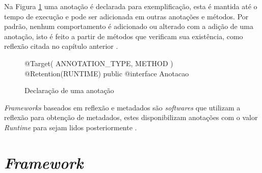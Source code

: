 \par Na Figura \ref{fig:declaracao-anotacao} uma anotação é declarada para exemplificação, esta é mantida até o tempo de execução e pode ser adicionada em outras anotações e métodos. Por padrão, nenhum comportamento é adicionado ou alterado com a adição de uma anotação, isto é feito a partir de métodos que verificam sua existência, como reflexão citada no capítulo anterior \cite{bloch2004jsr}. 

\begin{figure}[H]
    \centering
    \begin{java}
@Target({ ANNOTATION_TYPE, METHOD })
@Retention(RUNTIME)
public @interface Anotacao {
}
    \end{java}
    \caption{Declaração de uma anotação}
    \label{fig:declaracao-anotacao}
\end{figure}

\textit{Frameworks} baseados em reflexão e metadados são \textit{softwares} que utilizam a reflexão para obtenção de metadados, estes disponibilizam anotações com o valor \textit{Runtime} para sejam lidos posteriormente \cite{guerra2009pattern}.

\section{\textit{Framework}}

